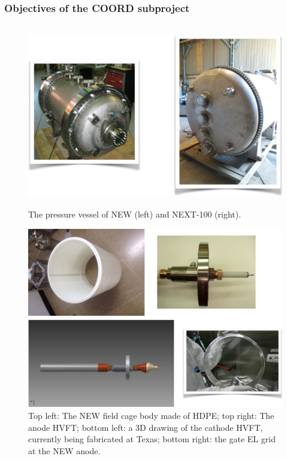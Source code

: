 %
%

\subsubsection*{Objectives of the COORD subproject}

%

\begin{figure}
\centering
\includegraphics[height=8cm]{img/PV.jpg}
\caption{The pressure vessel of NEW (left) and NEXT-100 (right).} \label{fig:PV}
\end{figure}

\begin{figure}[t!b!]
\begin{center}
\includegraphics[width=.9\textwidth]{img/FC2.jpg}
\end{center}
\caption{Top left: The NEW field cage body made of HDPE; top right: The anode HVFT;
bottom left: a 3D drawing of the cathode HVFT, currently being fabricated at Texas; bottom right: the gate EL grid at the NEW anode.
} \label{fig:FC}
\end{figure}


